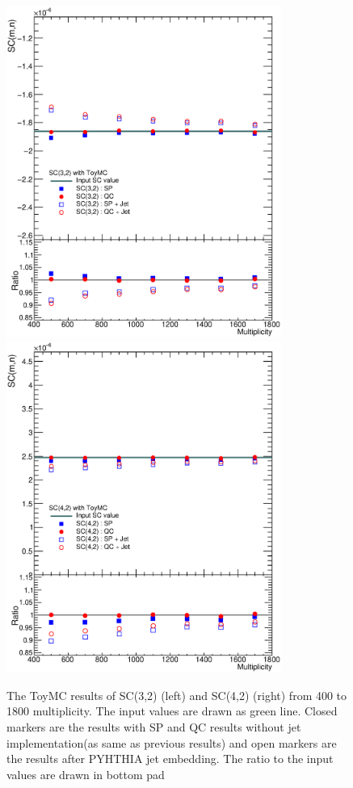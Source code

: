 \begin{figure}[h]
\centerline{\includegraphics[width=9.0cm]{figures/figs_ToyMC/SC_Comparison_SC32_highM_ToyMC.eps}\includegraphics[width=9.0cm]{figures/figs_ToyMC/SC_Comparison_SC42_highmulti_ToyMC}}
\caption{The ToyMC results of SC(3,2) (left) and SC(4,2) (right) from 400 to 1800 multiplicity. The input values are drawn as green line. Closed markers are the results with SP and QC results without jet implementation(as same as previous results) and open markers are the results after PYHTHIA jet embedding. The ratio to the input values are drawn in bottom pad}
\label{fig:ToyMC_withJet}
\end{figure}


